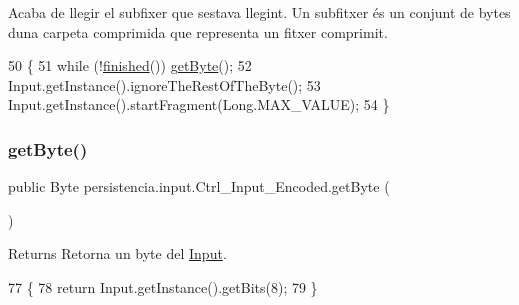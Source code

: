 Acaba de llegir el subfixer que s\textquotesingle{}estava llegint. Un subfitxer és un conjunt de bytes d\textquotesingle{}una carpeta comprimida que representa un fitxer comprimit. 


\begin{DoxyCode}
50                              \{
51         \textcolor{keywordflow}{while} (!\hyperlink{classpersistencia_1_1input_1_1Ctrl__Input_a5a94d207dce0fd592b5ac17f55154d4f}{finished}()) \hyperlink{classpersistencia_1_1input_1_1Ctrl__Input__Encoded_a38ede6bc49251e77ae4be30ccc06457d}{getByte}();
52         Input.getInstance().ignoreTheRestOfTheByte();
53         Input.getInstance().startFragment(Long.MAX\_VALUE);
54     \}
\end{DoxyCode}
\mbox{\label{classpersistencia_1_1input_1_1Ctrl__Input__Encoded_a38ede6bc49251e77ae4be30ccc06457d}} 
\subsubsection{\texorpdfstring{get\+Byte()}{getByte()}}
{\footnotesize\ttfamily public Byte persistencia.\+input.\+Ctrl\+\_\+\+Input\+\_\+\+Encoded.\+get\+Byte (\begin{DoxyParamCaption}{ }\end{DoxyParamCaption})\hspace{0.3cm}{\ttfamily [inline]}}

\begin{DoxyReturn}{Returns}
Retorna un byte del \hyperlink{classpersistencia_1_1input_1_1Input}{Input}. 
\end{DoxyReturn}

\begin{DoxyCode}
77                           \{
78         \textcolor{keywordflow}{return} Input.getInstance().getBits(8);
79     \}
\end{DoxyCode}
\mbox{\label{classpersistencia_1_1input_1_1Ctrl__Input__Encoded_aed32b42778121e7e55d8338d9eaaddb9}} 
